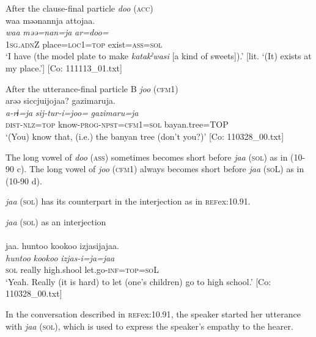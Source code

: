   \ex After the clause-final particle \textit{doo} (\textsc{acc})\\
      \glll    waa  məənannja  attojaa.\\
    \textit{waa}  \textit{məə=nan=ja}  \textit{ar=doo=}\\
    1\textsc{sg}.\textsc{adn}Z  place=\textsc{loc}1=\textsc{top}  exist=\textsc{ass}=\textsc{sol}\\
    \glt     ‘I have (the model plate to make \textit{katakˀwasi} [a kind of sweets]).’ [lit. ‘(It) exists at my place.’]  [Co: 111113\_01.txt]

   \ex After the utterance-final particle B \textit{joo} (\textsc{cfm}1)\\
      \glll    arəə  siccjuijojaa?  gazimaruja.\\
    \textit{a-rɨ=ja}  \textit{sij-tur-i=joo=}  \textit{gazimaru=ja}\\
    \textsc{dist}-\textsc{nlz}=\textsc{top}  know-\textsc{prog}-\textsc{npst}=\textsc{cfm}1=\textsc{sol}  bayan.tree=TOP\\
 \glt     ‘(You) know that, (i.e.) the banyan tree (don’t you?)’  [Co: 110328\_00.txt]
 \z
\z

The long vowel of \textit{doo} (\textsc{ass}) sometimes becomes short before \textit{jaa} (\textsc{sol}) as in (10-90 c). The long vowel of \textit{joo} (\textsc{cfm}1) always becomes short before \textit{jaa} (\textsc{so}L) as in (10-90 d).

  \textit{jaa} (\textsc{sol}) has its counterpart in the interjection as in \textsc{ref}{ex:10.91}.

\ea\label{ex:10.91}   \textit{jaa} (\textsc{sol}) as an interjection\\\\
      \glll    jaa.  huntoo  {\textbar}kookoo{\textbar}  izjasijajaa.\\
    \textit{}  \textit{huntoo}  \textit{kookoo}  \textit{izjas-i=ja=jaa}\\
    \textsc{sol}  really  high.shool  let.go-\textsc{inf}=\textsc{top}=\textsc{so}L\\
\glt     ‘Yeah. Really (it is hard) to let (one’s children) go to high school.’  [Co: 110328\_00.txt]
\z

In the conversation described in \textsc{ref}{ex:10.91}, the speaker started her utterance with \textit{jaa} (\textsc{sol}), which is used to express the speaker’s empathy to the hearer.

